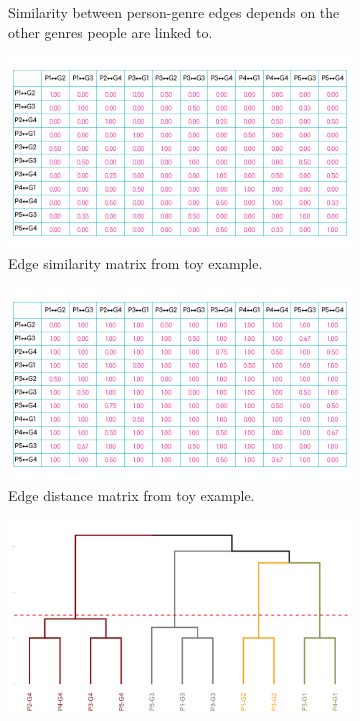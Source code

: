 \documentclass[a4paper,12pt]{extarticle}
\begin{document}
\begin{figure}[ht!]
\begin{subfigure}[b]{0.3\textwidth}
        \caption{Similarity between person-genre edges depends on the other genres people are linked to.}
        \label{fig:link-toy2}
    \end{subfigure}
     \begin{subfigure}[b]{0.45\textwidth}
        \includegraphics[width=1.0\textwidth]{Figs/Toy/link-clust-toy3.png}
        \caption{Edge similarity matrix from toy example.}
        \label{fig:link-toy3}
    \end{subfigure}
     \begin{subfigure}[b]{0.45\textwidth}
        \includegraphics[width=1.0\textwidth]{Figs/Toy/link-clust-toy4.png}
        \caption{Edge distance matrix from toy example.}
        \label{fig:link-toy4}
    \end{subfigure}
     \begin{subfigure}[b]{0.6\textwidth}
        \includegraphics[width=1.0\textwidth]{Figs/Toy/link-clust-toy5.png}

\end{subfigure}
\end{figure}
\end{document}
